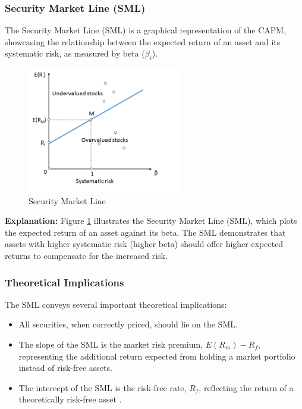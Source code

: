 \subsubsection{Security Market Line (SML)}
The Security Market Line (SML) is a graphical representation of the CAPM, showcasing the relationship between the expected return of an asset and its systematic risk, as measured by beta ($\beta_i$).

\begin{figure}[h!]
    \centering
    \includegraphics[width=0.6\textwidth]{../Figures/SML.png}
    \caption{Security Market Line}
    \label{fig:SML}
\end{figure}

\textbf{Explanation:} Figure \ref{fig:SML} illustrates the Security Market Line (SML), which plots the expected return of an asset against its beta. The SML demonstrates that assets with higher systematic risk (higher beta) should offer higher expected returns to compensate for the increased risk.

\subsubsection{Theoretical Implications}
The SML conveys several important theoretical implications:
\begin{itemize}
    \item All securities, when correctly priced, should lie on the SML.
    \item The slope of the SML is the market risk premium, $E(R_m) - R_f$, representing the additional return expected from holding a market portfolio instead of risk-free assets.
    \item The intercept of the SML is the risk-free rate, $R_f$, reflecting the return of a theoretically risk-free asset \citep{sharpe1964capital}.
\end{itemize}

